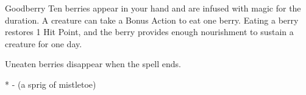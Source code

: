 \begin{Spell}[
    level=1st,
    time=1 Action,
    range=Self,
    components={V, S, M*},
    duration=24 Hours,
    school=Conjuration,
    attack=None,
    effect=Healing
]{Goodberry}
Ten berries appear in your hand and are infused with magic for the duration. A creature can take a Bonus Action to eat one berry. Eating a berry restores 1 Hit Point, and the berry provides enough nourishment to sustain a creature for one day.

Uneaten berries disappear when the spell ends.

* - (a sprig of mistletoe)
\end{Spell}

